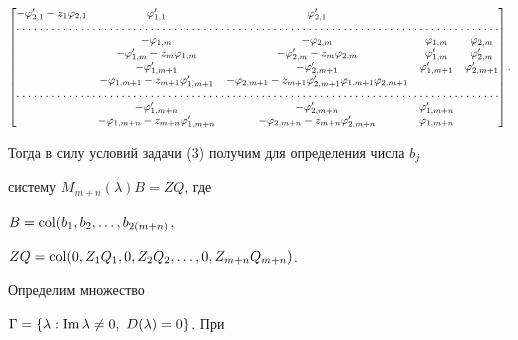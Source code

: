\begin{pf}
\begin{multline*}
\begin{bmatrix}
-\varphi'_{2,1}-z_1\varphi_{2,1} & \varphi'_{1,1} & \varphi'_{2,1} & \ 


& \ \\ 


\hdotsfor[1.5]{5} \\


\ & -\varphi_{1,m} & -\varphi_{2,m} & \varphi_{1,m} & \varphi_{2,m} \\ 


\ & -\varphi'_{1,m}-z_m\varphi_{1,m} & 


-\varphi'_{2,m}-z_m\varphi_{2,m} & \varphi'_{1,m} & 


\varphi'_{2,m} \\ 


\ & -\varphi'_{1,m+1} & -\varphi'_{2,m+1} & 


\varphi'_{1,m+1} & \varphi'_{2,m+1} \\ 


\ & -\varphi_{1,m+1}-z_{m+1}\varphi'_{1,m+1} & 


-\varphi_{2,m+1}-z_{m+1}\varphi'_{2,m+1} 


\varphi_{1,m+1}\varphi_{2,m+1} & \ & \ \\ 


\hdotsfor[1.5]{5} \\


\ & -\varphi'_{1,m+n} & -\varphi'_{2,m+n} & 


\varphi'_{1,m+n} & \ \\ 


\ & -\varphi_{1,m+n}-z_{m+n}\varphi'_{1,m+n} & 


-\varphi_{2,m+n}


-z_{m+n}\varphi'_{2,m+n} & \varphi_{1,m+n} & \ 


\end{bmatrix} 


. 


\end{multline*}  


Тогда в силу условий задачи (3) получим для определения числа $b_j$ 


систему $M_{m+n}(\lambda)B=ZQ$, где 


$B=\operatorname{col}(b_1,b_2,\dotsc,b_{2(m+n)}$, 


$ZQ=\operatorname{col}(0,Z_1Q_1,0,Z_2Q_2,\dotsc,0,Z_{m+n}Q_{m+n})$. 


 


Определим множество 


$\Gamma=\{\lambda:\im\lambda\ne 0, \ D(\lambda)=0\}$. При 



\end{pf}
